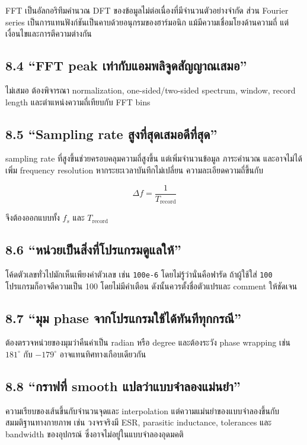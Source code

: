 FFT เป็นอัลกอริทึมคำนวณ DFT ของข้อมูลไม่ต่อเนื่องที่มีจำนวนตัวอย่างจำกัด ส่วน Fourier series เป็นการแทนฟังก์ชันเป็นคาบด้วยอนุกรมของฮาร์มอนิก แม้มีความเชื่อมโยงด้านความถี่ แต่เงื่อนไขและการตีความต่างกัน

\subsection{8.4 “FFT peak เท่ากับแอมพลิจูดสัญญาณเสมอ”}

ไม่เสมอ ต้องพิจารณา normalization, one-sided/two-sided spectrum, window, record length และตำแหน่งความถี่เทียบกับ FFT bins

\subsection{8.5 “Sampling rate สูงที่สุดเสมอดีที่สุด”}

sampling rate ที่สูงขึ้นช่วยครอบคลุมความถี่สูงขึ้น แต่เพิ่มจำนวนข้อมูล ภาระคำนวณ และอาจไม่ได้เพิ่ม frequency resolution หากระยะเวลาบันทึกไม่เปลี่ยน ความละเอียดความถี่ขึ้นกับ

\[
\Delta f=\frac{1}{T_{\text{record}}}
\]

จึงต้องออกแบบทั้ง $f_s$ และ $T_{\text{record}}$

\subsection{8.6 “หน่วยเป็นสิ่งที่โปรแกรมดูแลให้”}

โค้ดตัวเลขทั่วไปมักเห็นเพียงค่าตัวเลข เช่น \texttt{100e-6} โดยไม่รู้ว่านั่นคือฟารัด ถ้าผู้ใช้ใส่ \texttt{100} โปรแกรมก็อาจตีความเป็น 100 โดยไม่มีคำเตือน ดังนั้นควรตั้งชื่อตัวแปรและ comment ให้ชัดเจน

\subsection{8.7 “มุม phase จากโปรแกรมใช้ได้ทันทีทุกกรณี”}

ต้องตรวจหน่วยของมุมว่าคืนค่าเป็น radian หรือ degree และต้องระวัง phase wrapping เช่น $181^\circ$ กับ $-179^\circ$ อาจแทนทิศทางเกือบเดียวกัน

\subsection{8.8 “กราฟที่ smooth แปลว่าแบบจำลองแม่นยำ”}

ความเรียบของเส้นขึ้นกับจำนวนจุดและ interpolation แต่ความแม่นยำของแบบจำลองขึ้นกับสมมติฐานทางกายภาพ เช่น วงจรจริงมี ESR, parasitic inductance, tolerances และ bandwidth ของอุปกรณ์ ซึ่งอาจไม่อยู่ในแบบจำลองอุดมคติ

